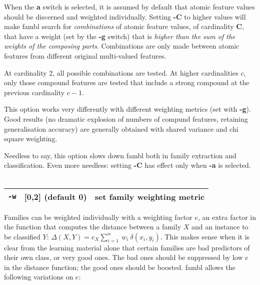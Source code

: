 \documentclass[11pt]{article}
\begin{document}
When the {\bf a} switch is selected, it is assumed by default that
atomic feature values should be discerned and weighted
individually. Setting {\bf -C} to higher values will make {\sc fambl}
search for {\em combinations} of atomic feature values, of cardinality
{\bf C}, that have a weight (set by the {\bf -g} switch) that is {\em
higher than the sum of the weights of the composing
parts}. Combinations are only made between atomic features from
different original multi-valued features. 

At cardinality 2, all possible combinations are tested. At higher
cardinalities $c$, only those compound features are tested that include
a strong compound at the previous cardinality $c-1$.

This option works very differently with different weighting metrics
(set with {\bf -g}). Good results (no dramatic explosion of numbers of
compund features, retaining generalisation accuracy) are generally
obtained with shared variance and chi square weighting.

Needless to say, this option slows down {\sc fambl} both in family
extraction and classification. Even more needless: setting {\bf -C}
has effect only when {\bf -a} is selected.
\ \\

\begin{tabular}{|p{}|p{}|p{}|}
\hline
{\tt -w} & [0,2] (default 0) & set family weighting metric \\
\hline
\end{tabular}

Families can be weighted individually with a weighting factor
$e$, an extra factor in the function that computes the distance
between a family $X$ and an instance to be classified $Y$:
$\Delta(X,Y) = e_{X} \sum_{i=1}^{n}\ w_{i}\
\delta(x_{i},y_{i})$. This makes sense when it is clear from the
learning material alone that certain families are bad predictors of
their own class, or very good ones. The bad ones should be suppressed
by low $e$ in the distance function; the good ones should be
boosted. {\sc fambl} allows the following variations on $e$:
\end{document}

